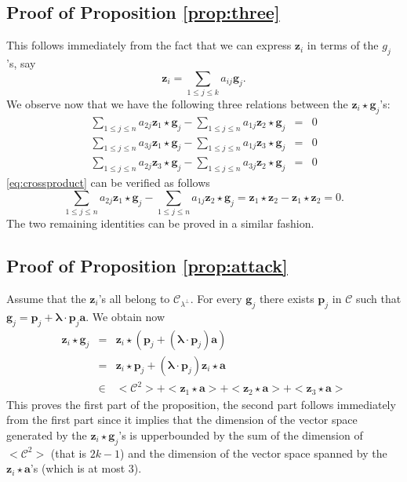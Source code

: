 \documentclass[runningheads,11pt]{llncs}
\newcommand{\code}[1]{\ensuremath{\mathscr{#1}}}
\newcommand{\CC}{\code{C}}
\newcommand{\sqc}[1]{<#1^2>}
\newcommand{\scp}[2]{#1\cdot #2}
\newcommand{\cwp}{\star}
\newcommand{\word}[1]{\ensuremath{\boldsymbol{#1}}}
\newcommand{\av}{\word{a}}
\newcommand{\lambdav}{\word{\lambda}}
\newcommand{\gv}{\word{g}}
\newcommand{\pv}{\word{p}}
\newcommand{\zv}{\word{z}}
\begin{document}
 
 
 \subsection{Proof of Proposition \ref{prop:three}}
 This follows immediately from the fact that we can express
 $\zv_i$ in terms of the $g_j$'s, say
 $$
 \zv_i = \sum_{1 \leqslant  j \leqslant  k} a_{ij} \gv_j.
 $$
 We observe now that we have the following three  relations between the 
$\zv_i \cwp \gv_j$'s:
\begin{eqnarray}
\sum_{1 \leqslant  j \leqslant  n} a_{2j} \zv_1 \cwp \gv_j - \sum_{1 \leqslant  j \leqslant  n} a_{1j} \zv_2 \cwp \gv_j &= & 0 \label{eq:crossproduct}\\
\sum_{1 \leqslant  j \leqslant  n} a_{3j} \zv_1 \cwp \gv_j - \sum_{1 \leqslant  j \leqslant  n} a_{1j} \zv_3 \cwp \gv_j &= & 0\\
\sum_{1 \leqslant  j \leqslant  n} a_{2j} \zv_3 \cwp \gv_j - \sum_{1 \leqslant  j \leqslant  n} a_{3j} \zv_2 \cwp \gv_j &= & 0
\end{eqnarray}
\eqref{eq:crossproduct} can be verified as follows
$$
\sum_{1 \leqslant  j \leqslant  n} a_{2j} \zv_1 \cwp \gv_j - \sum_{1 \leqslant  j \leqslant  n} a_{1j} \zv_2 \cwp \gv_j 
= \zv_1 \cwp \zv_2 - \zv_1 \cwp \zv_2 = 0.
$$
The two remaining identities can be proved in a similar fashion.

\subsection{Proof of Proposition \ref{prop:attack}}
Assume that the $\zv_i$'s all belong to $\CC_{\lambda^\perp}$. For every $\gv_j$ there exists
$\pv_j$ in $\CC$ such that $\gv_j=\pv_j + \scp{\lambdav}{\pv_j}\av$.
We obtain now
\begin{eqnarray}
\zv_i \cwp \gv_j & = & \zv_i \cwp (\pv_j + (\scp{\lambdav}{\pv_j})\av) \nonumber \\
& =& \zv_i \cwp \pv_j + (\scp{\lambdav}{\pv_j})\zv_i \cwp \av \nonumber \\
& \in & \sqc{\CC} + <\zv_1 \cwp \av> + <\zv_2 \cwp \av> + <\zv_3 \cwp \av>
\end{eqnarray}
This proves the first part of the proposition, the second part follows immediately from 
the first part since it implies that the dimension of
the vector space generated by the $\zv_i \cwp \gv_j$'s is upperbounded by the
sum of the dimension of $\sqc{\CC}$ (that is $2k-1$) and the dimension of the 
vector space spanned by the $\zv_i \cwp \av$'s (which is at most $3$).
\end{document}
